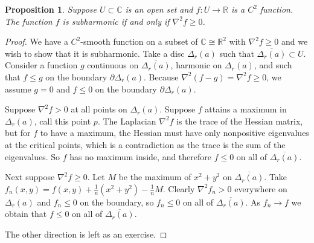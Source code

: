 \documentclass[12pt,openany]{book}
\newcommand{\C}{{\mathbb{C}}}
\newcommand{\R}{{\mathbb{R}}}
\theoremstyle{plain}
\newtheorem{prop}[thm]{Proposition}
\theoremstyle{remark}
\theoremstyle{definition}
\theoremstyle{exercise}
\theoremstyle{example}
\begin{document}

\begin{prop}
Suppose $U \subset \C$ is an open set and $f \colon U \to \R$ is a $C^2$ function.
The function $f$ is subharmonic if and only if
$\nabla^2 f \geq 0$.
\end{prop}

\begin{proof}
We have a $C^2$-smooth function on a subset of $\C \cong \R^2$
with $\nabla^2 f \geq 0$ and we wish to show that it is subharmonic.
Take a disc $\Delta_r(a)$ such that $\overline{\Delta_r(a)} \subset U$.
Consider a function
$g$ continuous on $\overline{\Delta_r(a)}$,
harmonic on $\Delta_r(a)$, and such that
$f \leq g$ on the boundary $\partial \Delta_r(a)$.  Because
$\nabla^2 (f-g) = \nabla^2 f \geq 0$, we assume $g = 0$ and $f \leq 0$
on the boundary $\partial \Delta_r(a)$. 

Suppose $\nabla^2 f > 0$ at all points on $\Delta_r(a)$.
Suppose $f$ attains a maximum in $\Delta_r(a)$,
call this point $p$.  
The Laplacian $\nabla^2 f$ is the trace of the Hessian matrix, but for $f$ to have a
maximum, the Hessian must have only nonpositive eigenvalues at the critical
points, which is a
contradiction as the trace is the sum of the eigenvalues.  So $f$ has no
maximum inside, and therefore $f \leq 0$ on all of
$\overline{\Delta_r(a)}$.

Next suppose $\nabla^2 f \geq 0$.
Let $M$ be the maximum of $x^2+y^2$ on $\overline{\Delta_r(a)}$.
Take $f_n(x,y) = f(x,y) + \frac{1}{n}
( x^2+y^2 ) - \frac{1}{n}M$.  Clearly $\nabla^2 f_n > 0$ everywhere on
$\Delta_r(a)$ and
$f_n \leq 0$ on the boundary, so $f_n \leq 0$ 
on all of $\overline{\Delta_r(a)}$.  As $f_n \to f$ we obtain that
$f \leq 0$ on all of $\overline{\Delta_r(a)}$.

The other direction is left as an exercise.
%
%
\end{proof}
\end{document}
